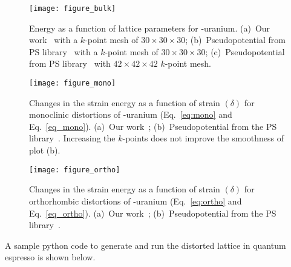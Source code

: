 \begin{figure}
	\centering
	\texttt{[image: figure\_bulk]}
    \caption[Energy as a function of lattice parameters for \textgamma-uranium.]{Energy as a function of lattice parameters for \textgamma-uranium. (a)~Our work~\cite{iasir2020pseudopotential} with a $k$-point mesh of $30\times30\times30$; (b)~Pseudopotential from PS library~\cite{dal2014pseudopotentials, pp1}
 with a $k$-point mesh of $30\times30\times30$; (c)~Pseudopotential from PS library~\cite{dal2014pseudopotentials, pp1}
 with $42\times42\times42$ $k$-point mesh.}
	\label{fig:bulkgamma}
\end{figure}

\begin{figure}
	\centering
	\texttt{[image: figure\_mono]}
    \caption[Changes in the strain energy as a function of strain $(\delta)$ for monoclinic distortions of \textgamma-uranium ]{Changes in the strain energy as a function of strain $(\delta)$ for monoclinic distortions of \textgamma-uranium (Eq.~\eqref{eq:mono} and Eq.~\eqref{eq_mono}). (a)~Our work~\cite{iasir2020pseudopotential}; (b)~Pseudopotential from the PS library~\cite{dal2014pseudopotentials, pp1}. Increasing the $k$-points does not improve the smoothness of plot (b).}
\label{fig:monogamma}
\end{figure}


\begin{figure}
	\centering
	\texttt{[image: figure\_ortho]}
    \caption[Changes in the strain energy as a function of strain $(\delta)$ for orthorhombic distortions of \textgamma-uranium ]{Changes in the strain energy as a function of strain $(\delta)$ for orthorhombic distortions of \textgamma-uranium (Eq.~\eqref{eq:ortho} and Eq.~\eqref{eq_ortho}). (a)~Our work~\cite{iasir2020pseudopotential}; (b)~Pseudopotential from the PS library~\cite{dal2014pseudopotentials, pp1}.}
	\label{fig:orthogamma}
\end{figure}

A sample python code to generate and run the distorted lattice in quantum espresso is shown below.




